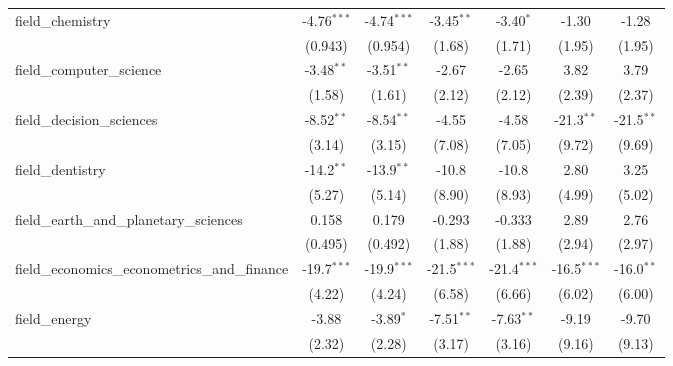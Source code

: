 \begin{tabular}{lcccccc}
   field\_chemistry                                            & -4.76$^{***}$  & -4.74$^{***}$  & -3.45$^{**}$  & -3.40$^{*}$   & -1.30         & -1.28\\   
                                                               & (0.943)        & (0.954)        & (1.68)        & (1.71)        & (1.95)        & (1.95)\\   
   field\_computer\_science                                    & -3.48$^{**}$   & -3.51$^{**}$   & -2.67         & -2.65         & 3.82          & 3.79\\   
                                                               & (1.58)         & (1.61)         & (2.12)        & (2.12)        & (2.39)        & (2.37)\\   
   field\_decision\_sciences                                   & -8.52$^{**}$   & -8.54$^{**}$   & -4.55         & -4.58         & -21.3$^{**}$  & -21.5$^{**}$\\   
                                                               & (3.14)         & (3.15)         & (7.08)        & (7.05)        & (9.72)        & (9.69)\\   
   field\_dentistry                                            & -14.2$^{**}$   & -13.9$^{**}$   & -10.8         & -10.8         & 2.80          & 3.25\\   
                                                               & (5.27)         & (5.14)         & (8.90)        & (8.93)        & (4.99)        & (5.02)\\   
   field\_earth\_and\_planetary\_sciences                      & 0.158          & 0.179          & -0.293        & -0.333        & 2.89          & 2.76\\   
                                                               & (0.495)        & (0.492)        & (1.88)        & (1.88)        & (2.94)        & (2.97)\\   
   field\_economics\_econometrics\_and\_finance                & -19.7$^{***}$  & -19.9$^{***}$  & -21.5$^{***}$ & -21.4$^{***}$ & -16.5$^{***}$ & -16.0$^{**}$\\   
                                                               & (4.22)         & (4.24)         & (6.58)        & (6.66)        & (6.02)        & (6.00)\\   
   field\_energy                                               & -3.88          & -3.89$^{*}$    & -7.51$^{**}$  & -7.63$^{**}$  & -9.19         & -9.70\\   
                                                               & (2.32)         & (2.28)         & (3.17)        & (3.16)        & (9.16)        & (9.13)\\   

\end{tabular}
